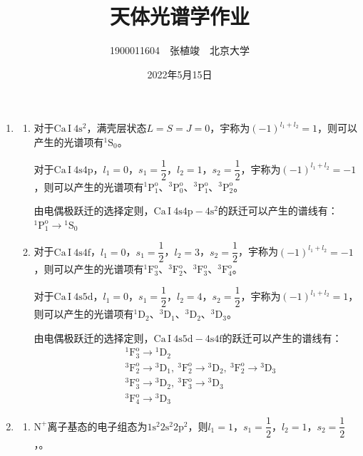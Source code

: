 \documentclass[a4paper]{article}
\begin{document}
\title{\textbf{天体光谱学作业}}
\author{1900011604\ \ 张植竣\ \ 北京大学}
\date{2022年5月15日}
\maketitle

\begin{enumerate}

    \item[1.]
    \begin{enumerate}
        \item[(a)]
        对于$\mathrm{Ca\,I\ 4s^2}$，满壳层状态$L=S=J=0$，宇称为$(-1)^{l_1+l_2}=1$，则可以产生的光谱项有$\mathrm{^1S_0}$。

        对于$\mathrm{Ca\,I\ 4s 4p}$，$l_1=0$，$s_1=\dfrac{1}{2}$，$l_2=1$，$s_2=\dfrac{1}{2}$，宇称为$(-1)^{l_1+l_2}=-1$，则可以产生的光谱项有$\mathrm{^1P_1^o}$、$\mathrm{^3P_0^o}$、$\mathrm{^3P_1^o}$、$\mathrm{^3P_2^o}$。
    
        由电偶极跃迁的选择定则，$\mathrm{Ca\,I\ 4s 4p - 4s^2}$的跃迁可以产生的谱线有：$\mathrm{^1P_1^o}\to\mathrm{^1S_0}$

        \item[(b)]
        对于$\mathrm{Ca\,I\ 4s 4f}$，$l_1=0$，$s_1=\dfrac{1}{2}$，$l_2=3$，$s_2=\dfrac{1}{2}$，宇称为$(-1)^{l_1+l_2}=-1$，则可以产生的光谱项有$\mathrm{^1F_3^o}$、$\mathrm{^3F_2^o}$、$\mathrm{^3F_3^o}$、$\mathrm{^3F_4^o}$。

        对于$\mathrm{Ca\,I\ 4s 5d}$，$l_1=0$，$s_1=\dfrac{1}{2}$，$l_2=4$，$s_2=\dfrac{1}{2}$，宇称为$(-1)^{l_1+l_2}=1$，则可以产生的光谱项有$\mathrm{^1D_2}$、$\mathrm{^3D_1}$、$\mathrm{^3D_2}$、$\mathrm{^3D_3}$。
    
        由电偶极跃迁的选择定则，$\mathrm{Ca\,I\ 4s 5d - 4s 4f}$的跃迁可以产生的谱线有：
        \begin{align*}
            &\mathrm{^1F_3^o} \to \mathrm{^1D_2} \\
            &\mathrm{^3F_2^o} \to \mathrm{^3D_1},\ \mathrm{^3F_2^o} \to \mathrm{^3D_2},\ \mathrm{^3F_2^o} \to \mathrm{^3D_3} \\
            &\mathrm{^3F_3^o} \to \mathrm{^3D_2},\ \mathrm{^3F_3^o} \to \mathrm{^3D_3} \\
            &\mathrm{^3F_4^o} \to \mathrm{^3D_3}
        \end{align*}
    \end{enumerate}

    \bigskip
    \item[2.]
    \begin{enumerate}
        \item[(a)]
        $\mathrm{N}^+$离子基态的电子组态为$\mathrm{1s^2 2s^2 2p^2}$，则$l_1=1$，$s_1=\dfrac{1}{2}$，$l_2=1$，$s_2=\dfrac{1}{2}$，。
        

\end{enumerate}
\end{enumerate}
\end{document}

